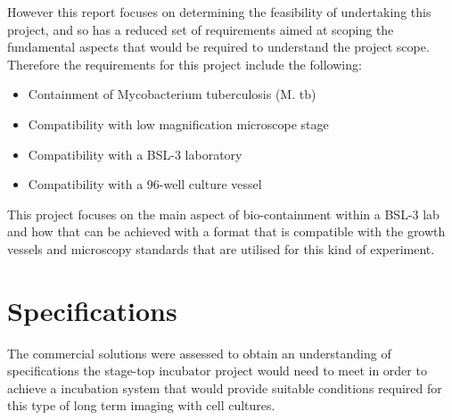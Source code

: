 \documentclass[class=report,11pt,crop=false]{standalone}
\begin{document}
However this report focuses on determining the feasibility of undertaking this project, and so has a reduced set of requirements aimed at scoping the fundamental aspects that would be required to understand the project scope.
Therefore the requirements for this project include the following:
\begin{itemize}
	\item Containment of Mycobacterium tuberculosis (M. tb)
	\item Compatibility with low magnification microscope stage
	\item Compatibility with a BSL-3 laboratory
	\item Compatibility with a 96-well culture vessel
\end{itemize}

This project focuses on the main aspect of bio-containment within a BSL-3 lab and how that can be achieved with a format that is compatible with the growth vessels and microscopy standards that are utilised for this kind of experiment.

\section{Specifications}

The commercial solutions were assessed to obtain an understanding of specifications the stage-top incubator project would need to meet in order to achieve a incubation system that would provide suitable conditions required for this type of long term imaging with cell cultures.
\end{document}

